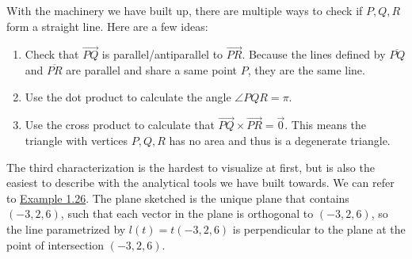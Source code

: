 With the machinery we have built up, there are multiple ways to check if $P,Q,R$ form a straight line. Here are a few ideas:\begin{enumerate}
	\item Check that $\overrightarrow{PQ}$ is parallel/antiparallel to $\overrightarrow{PR}$. Because the lines defined by $\overline{PQ}$ and $\overline{PR}$ are parallel and share a same point $P$, they are the same line.
	\item Use the dot product to calculate the angle $\angle PQR=\pi$.
	\item Use the cross product to calculate that $\overrightarrow{PQ}\times\overrightarrow{PR}=\vec{0}$. This means the triangle with vertices $P,Q,R$ has no area and thus is a degenerate triangle.

\end{enumerate}
\begin{remark}
	The third characterization is the hardest to visualize at first, but is also the easiest to describe with the analytical tools we have built towards. We can refer to \hyperref[ex:1.26]{Example 1.26}. The plane sketched is the unique plane that contains $(-3,2,6)$, such that each vector in the plane is orthogonal to $(-3,2,6)$, so the line parametrized by $l(t)=t(-3,2,6)$ is perpendicular to the plane at the point of intersection $(-3,2,6)$.
\end{remark}

